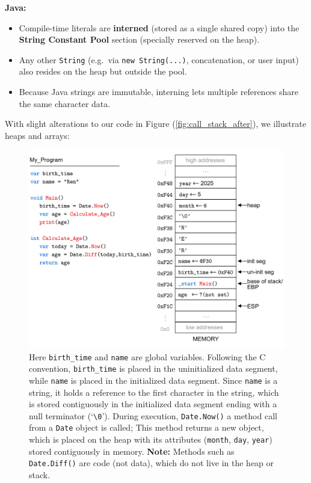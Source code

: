 \begin{Def}
    \noindent
    \textbf{Java:}  
    \begin{itemize}
      \item Compile-time literals are \textbf{interned} (stored as a single shared copy) into the \textbf{String Constant Pool} section (specially reserved on the heap).  
      \item Any other \texttt{String} (e.g.\ via \texttt{new String(...)}, concatenation, or user input) also resides on the heap but outside the pool.  
      \item Because Java strings are immutable, interning lets multiple references share the same character data.
    \end{itemize}

    
\end{Def}

\newpage

\noindent
With slight alterations to our code in Figure (\ref{fig:call_stack_after}), we illustrate heaps and arrays:

\begin{figure}[!ht]
    \centering
    \includegraphics[width=\textwidth]{./Sections/stacks_heaps/heap_array.png}
    \caption{Here \texttt{birth\_time} and \texttt{name} are global variables. Following the C convention, \texttt{birth\_time} is placed in the 
    uninitialized data segment, while \texttt{name} is placed in the initialized data segment. Since \texttt{name} is a string, it holds a 
    reference to the first character in the string, which is stored contiguously in the initialized data segment ending with a null terminator (`\texttt{\textbackslash 0}').
    During execution, \texttt{Date.Now()} a method call from a \texttt{Date} object is called; This method returns a new object, which is placed on the heap with 
    its attributes (\texttt{month}, \texttt{day}, \texttt{year}) stored contiguously in memory. \textbf{Note:} Methods such as \texttt{Date.Diff()} are code (not data), 
    which do not live in the heap or stack.}
    \label{fig:heap_array}
\end{figure}

